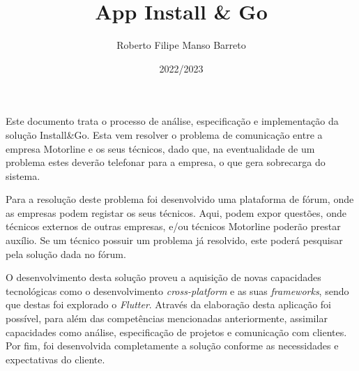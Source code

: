 \documentclass[a4paper,12pt,twoside]{book}
\title{App Install \& Go}
\author{Roberto Filipe Manso Barreto}
\date{2022/2023}
\begin{document}
\frontmatter

\maketitle


\begin{resumo}
Este documento trata o processo de análise, especificação e implementação da solução Install\&Go. Esta vem resolver o problema de comunicação entre a empresa Motorline e os seus técnicos, dado que, na eventualidade de um problema estes deverão telefonar para a empresa, o que gera sobrecarga do sistema.

Para a resolução deste problema foi desenvolvido uma plataforma de fórum, onde as empresas podem registar os seus técnicos. Aqui, podem expor questões, onde técnicos externos de outras empresas, e/ou técnicos Motorline poderão prestar auxílio. Se um técnico possuir um problema já resolvido, este poderá pesquisar pela solução dada no fórum.

O desenvolvimento desta solução proveu a aquisição de novas capacidades tecnológicas como o desenvolvimento \textit{cross-platform} e as suas \textit{frameworks}, sendo que destas foi explorado o \textit{Flutter}. Através da elaboração desta aplicação foi possível, para além das competências mencionadas anteriormente, assimilar capacidades como análise, especificação de projetos e comunicação com clientes. Por fim, foi desenvolvida completamente a solução conforme as necessidades e expectativas do cliente.



\end{resumo}
\end{document}
